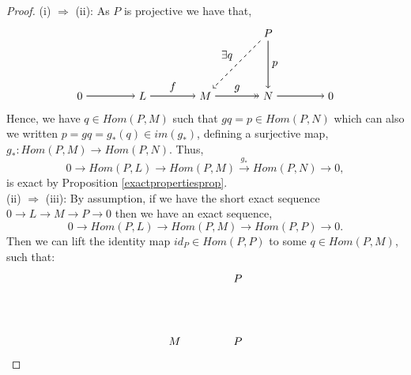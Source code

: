 \documentclass[11.5pt, twoside, a4paper, titlepage]{report}
\theoremstyle{definition}
\theoremstyle{plain}
\begin{document}
\begin{proof} (i) $\Rightarrow$ (ii): As $P$ is projective we have that,
\begin{equation*}
\begin{tikzpicture}[->,-latex, auto, main path/.style={->, semithick}, main node/.style={}]
\node	[main node]		(1) at (0,0)		{$M$};
\node	[main node]		(2) at (2,0)		{$N$};
\node [main node]		(3) at (2,2)		{$P$};
\node [main node]		(4) at (-2, 0)		{$L$};
\node [main node]		(5) at (-4, 0)		{$0$};
\node [main node]		(6) at (4, 0)		{$0$};

\draw (1) edge [->>, semithick] node [auto] {$g$} (2);
\draw (3) edge [main path] node [auto] {$p$} (2);
\draw (3) edge [dashed, ->, semithick] node [auto, swap] {$\exists q$} (1);
\draw (4) edge [main path] node [auto] {$f$} (1);
\draw (5) edge [main path] (4);
\draw (2) edge [main path] (6);
\end{tikzpicture}
\end{equation*}
Hence, we have $q\in Hom(P,M)$ such that $gq=p\in Hom(P,N)$ which can also we written $p=gq=g_{\ast}(q)\in im(g_{\ast})$, defining a surjective map, $g_{\ast}: Hom(P,M) \to Hom(P,N)$. Thus,
\begin{equation*}
0\xrightarrow{}Hom(P,L) \xrightarrow{}Hom(P,M)\xrightarrow{g_{\ast}}Hom(P,N)\xrightarrow{}0,
\end{equation*}
is exact by Proposition \ref{exactpropertiesprop}.\\
(ii) $\Rightarrow$ (iii): By assumption, if we have the short exact sequence $0\xrightarrow{}L\xrightarrow{}M\xrightarrow{}P\xrightarrow{}0$ then we have an exact sequence,
\begin{equation*}
0\xrightarrow{}Hom(P,L) \xrightarrow{}Hom(P,M)\xrightarrow{}Hom(P,P)\xrightarrow{}0.
\end{equation*}
Then we can lift the identity map $id_P\in Hom(P,P)$ to some $q\in Hom(P,M)$, such that:
\begin{equation*}
\begin{tikzpicture}[->,-latex, auto, main path/.style={->, semithick}, main node/.style={}]
\node	[main node]		(1) at (0,0)		{$M$};
\node	[main node]		(2) at (2,0)		{$P$};
\node [main node]		(3) at (2,2)		{$P$};


\end{tikzpicture}
\end{equation*}
\end{proof}
\end{document}
